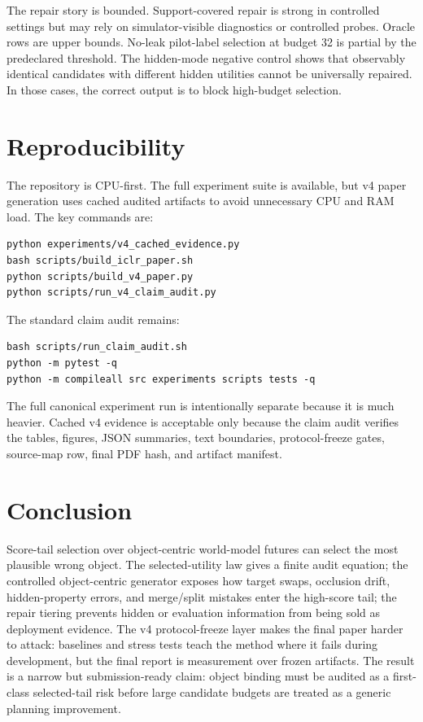 \documentclass[10pt]{article}
\begin{document}
The repair story is bounded. Support-covered repair is strong in controlled settings but may rely on simulator-visible diagnostics or controlled probes. Oracle rows are upper bounds. No-leak pilot-label selection at budget 32 is partial by the predeclared threshold. The hidden-mode negative control shows that observably identical candidates with different hidden utilities cannot be universally repaired. In those cases, the correct output is to block high-budget selection.

\section{Reproducibility}

The repository is CPU-first. The full experiment suite is available, but v4 paper generation uses cached audited artifacts to avoid unnecessary CPU and RAM load. The key commands are:
\begin{verbatim}
python experiments/v4_cached_evidence.py
bash scripts/build_iclr_paper.sh
python scripts/build_v4_paper.py
python scripts/run_v4_claim_audit.py
\end{verbatim}
The standard claim audit remains:
\begin{verbatim}
bash scripts/run_claim_audit.sh
python -m pytest -q
python -m compileall src experiments scripts tests -q
\end{verbatim}
The full canonical experiment run is intentionally separate because it is much heavier. Cached v4 evidence is acceptable only because the claim audit verifies the tables, figures, JSON summaries, text boundaries, protocol-freeze gates, source-map row, final PDF hash, and artifact manifest.

\section{Conclusion}

Score-tail selection over object-centric world-model futures can select the most plausible wrong object. The selected-utility law gives a finite audit equation; the controlled object-centric generator exposes how target swaps, occlusion drift, hidden-property errors, and merge/split mistakes enter the high-score tail; the repair tiering prevents hidden or evaluation information from being sold as deployment evidence. The v4 protocol-freeze layer makes the final paper harder to attack: baselines and stress tests teach the method where it fails during development, but the final report is measurement over frozen artifacts. The result is a narrow but submission-ready claim: object binding must be audited as a first-class selected-tail risk before large candidate budgets are treated as a generic planning improvement.
\end{document}
